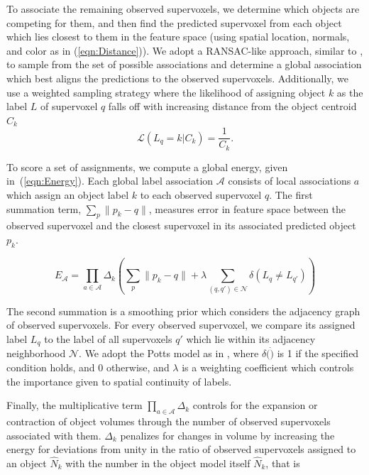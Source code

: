 To associate the remaining observed supervoxels, we determine which objects are competing for them, and then find the predicted supervoxel from each object which lies closest to them in the feature space (using spatial location, normals, and color as in (\ref{eqn:Distance})). We adopt a RANSAC-like approach, similar to \cite{EnergyBasedMultiModel}, to sample from the set of possible associations and determine a global association which best aligns the predictions to the observed supervoxels. Additionally, we use a weighted sampling strategy where the likelihood of assigning object $k$ as the label $L$ of supervoxel $q$ falls off with increasing distance from the object centroid $C_k$
\begin{equation}
 \label{eqn:WeightSampling}
 \mathcal{L}(L_q=k | C_k) = \frac{1}{C_k}.
\end{equation}

To score a set of assignments, we compute a global energy, given in~(\ref{eqn:Energy}). Each global label association $\mathcal{A}$ consists of local associations $a$ which assign an object label $k$ to each observed supervoxel $q$. The first summation term, $ \sum_{p}{\|p_k - q\|} $, measures error in feature space between the observed supervoxel and the closest supervoxel in its associated predicted object $p_k$. 

\begin{equation}
\label{eqn:Energy}
{E}_\mathcal{A} =\prod_{a\in\mathcal{A}}{\Delta_k} \left( \sum_{p}{\|p_k - q\|} + \lambda \sum_{(q,q')\in \mathcal{N} }\delta(L_q \not= L_{q'}) \right) 
\end{equation}

The second summation is a smoothing prior which considers the adjacency graph of observed supervoxels. For every observed supervoxel, we compare its assigned label $L_q$ to the label of all supervoxels $q'$ which lie within its adjacency neighborhood $\mathcal{N}$. We adopt the Potts model as in \cite{Boykov2001}, where $\delta(\dot)$ is 1 if the specified condition holds, and 0 otherwise, and $\lambda$ is a weighting coefficient which controls the importance given to spatial continuity of labels.

Finally, the multiplicative term $\prod_{a\in\mathcal{A}}{\Delta_k}$ controls for the expansion or contraction of object volumes through the number of observed supervoxels associated with them. $\Delta_k$ penalizes for changes in volume by increasing the energy for deviations from unity in the ratio of observed supervoxels assigned to an object $\hat{N}_k$ with the number in the object model itself $\hat{N}_k$, that is


